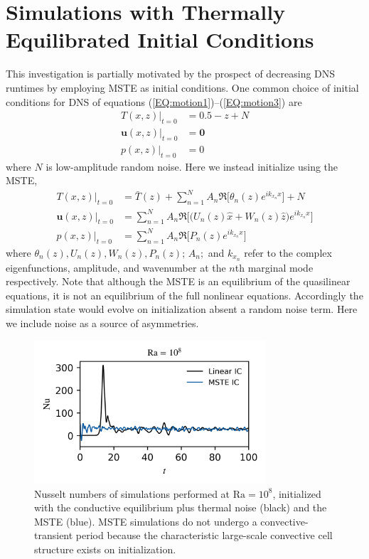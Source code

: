 \documentclass[reprint,amsmath,amssymb,aps]{revtex4-1}
\newcommand\Ra{\mathrm{Ra}}
\renewcommand{\vec}[1]{\boldsymbol{#1}}
\newcommand{\eqss}[2]{(\ref{#1})--(\ref{#2})}
\begin{document}
\section{Simulations with Thermally Equilibrated Initial Conditions}\label{sec:sims}
This investigation is partially motivated by the prospect of decreasing DNS runtimes by employing MSTE as initial conditions. 
One common choice of initial conditions for DNS of equations \eqss{EQ:motion1}{EQ:motion3} are
\begin{align}
    T(x, z)\big|_{t=0} &= 0.5 - z + N \nonumber \\
    \vec{u}(x, z)\big|_{t=0} &= \vec{0} \nonumber \\
    p(x, z)\big|_{t=0} &= 0 \label{EQ:linear_ic}
\end{align}
where $N$ is low-amplitude random noise.
Here we instead initialize using the MSTE,
\begin{align}
    T(x, z)\big|_{t=0} &= \bar{T}(z) + \sum_{n=1}^N  A_n \Re \Big[ \theta_n(z) e^{ik_{x_n}x} \Big] + N \nonumber \\
    \vec{u}(x, z)\big|_{t=0} &= \sum_{n=1}^N A_n \Re \Big[\Big( U_n (z) \hat{x} + W_n(z) \hat{z} \Big) e^{ik_{x_n}x} \Big] \nonumber\\
    p(x, z)\big|_{t=0} &= \sum_{n=1}^N A_n \Re \Big[P_n (z) e^{ik_{x_n}x}\Big] \label{EQ:mste_ic}
\end{align}
where $\theta_n(z), U_n(z), W_n(z), P_n(z); \, A_n; $ and $k_{x_n}$ refer to the complex eigenfunctions, amplitude, and wavenumber at the $n$th marginal mode respectively. 
Note that although the MSTE is an equilibrium of the quasilinear equations, it is not an equilibrium of the full nonlinear equations.
Accordingly the simulation state would evolve on initialization absent a random noise term.
Here we include noise as a source of asymmetries. 

\begin{figure}
    \begin{minipage}{3.4in}
        \centering
        \includegraphics[width=3.4in]{sim_eq_nu.png}
        \caption{Nusselt numbers of simulations performed at $\Ra = 10^8$, initialized with the conductive equilibrium plus thermal noise (black) and the MSTE (blue). 
        MSTE simulations do not undergo a convective-transient period because the characteristic large-scale convective cell structure exists on initialization.}
        \label{fig:nu_sim}
    \end{minipage}
\end{figure}
\end{document}
